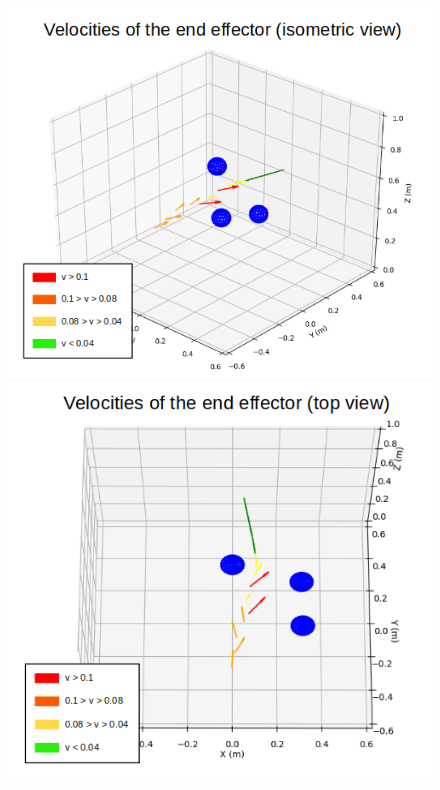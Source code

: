\documentclass[a4paper, 10pt, conference]{ieeeconf}      %
\begin{document}
\begin{figure}[H]
	\centering
	\includegraphics[scale=0.30]{images/one_arm_three_obstacles_vector.png}
	\includegraphics[scale=0.30]{images/one_arm_three_obstacles_top_vector.png}

\end{figure}
\end{document}
